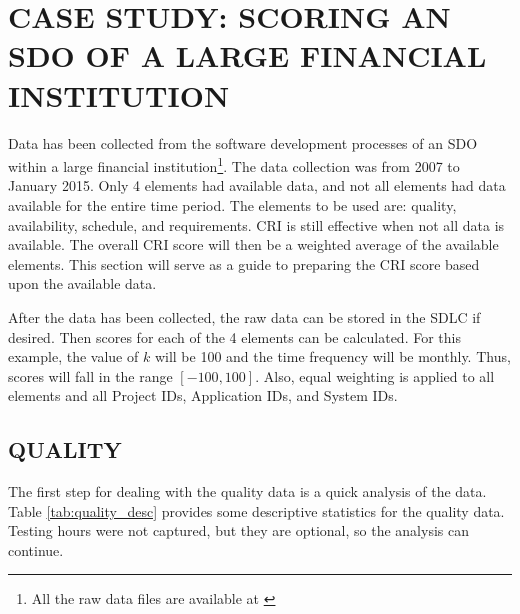 \documentclass[SDSUThesis.tex]{subfiles}
\begin{document}
\section{CASE STUDY: SCORING AN SDO OF A LARGE FINANCIAL INSTITUTION}

    Data has been collected from the software development processes of
    an SDO within a large financial institution\footnote{All the raw data 
    files are available at \cite{Swanstrom2015}}.
    The data collection was from 2007 to January 2015. Only 4 elements had available
    data, and not all elements had data available for the entire time period.  The
    elements to be used are: quality, availability, schedule, and requirements.
    CRI is still effective when not all data is available.
    The overall CRI score will then be a 
    weighted average of the available elements. 
    This section will serve as a guide to preparing the CRI score
    based upon the available data.  

    After the data has been collected, the raw data can be stored in the SDLC
    if desired.  Then scores for each of the 4 elements can be calculated.
    For this example, the value of $k$ will be 100 and the time
    frequency will be monthly.  Thus, scores will fall
    in the range $[-100,100]$.  Also, equal weighting is applied to 
    all elements and all Project IDs, Application IDs, and System IDs.
    
    \subsection{QUALITY}
        The first step for dealing with the quality data is a quick
        analysis of the data.  Table \ref{tab:quality_desc} provides
        some descriptive statistics for the quality data.  Testing hours
        were not captured, but they are optional, so the analysis can 
        continue.
        
\end{document}
